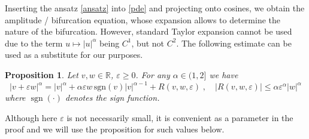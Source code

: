\documentclass{article}
\numberwithin{equation}{section}
\newtheorem{proposition}[theorem]{Proposition}
\def\R{\mathbb{R}}
\def\eps{\varepsilon}
\begin{document}
Inserting the ansatz \eqref{ansatz} into \eqref{pde} and projecting onto cosines, we obtain the amplitude / bifurcation equation, whose expansion allows to determine the nature of the bifurcation. However, standard Taylor expansion cannot be used due to the term $u\mapsto |u|^\alpha$ being $C^1$, but not $C^2$. The following estimate can be used as a substitute for our purposes. 
\begin{proposition} \label{prop:replacement of Taylor}
			Let $v,w\in\R$, $\eps\geq 0$. For any $\alpha \in (1,2]$ we have
			\begin{equation}\label{prop eq 1}
				|v + \eps w|^\alpha = |v|^\alpha + \alpha \eps w\,\mathrm{sgn}(v)
				  |v|^{\alpha-1} + R(v,w,\eps) 
				\;, \quad |R(v,w,\eps)| \leq \alpha \eps^\alpha |w|^\alpha
			\end{equation}
			where  
			$\operatorname{sgn}(\cdot)$ denotes the sign function. 
\end{proposition}
Although here $\eps$ is not necessarily small, it is convenient as a parameter in the proof and we will use the proposition for such values below.
\end{document}
